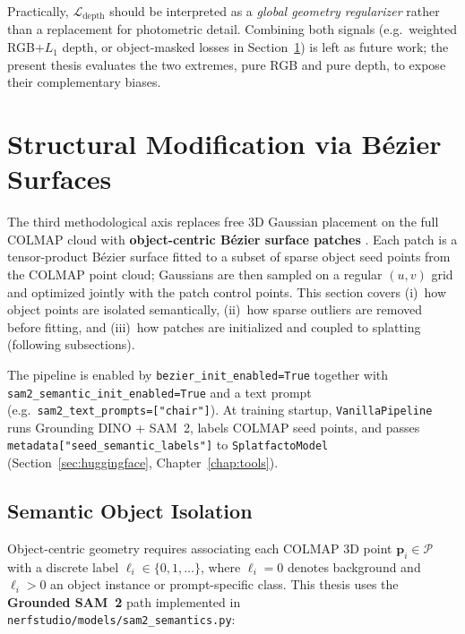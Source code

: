 \documentclass{report}
\newcommand{\filepath}[1]{\nolinkurl{#1}}
\newcommand{\code}[1]{\nolinkurl{#1}}
\begin{document}
Practically, $\mathcal{L}_{\mathrm{depth}}$ should be interpreted as a \emph{global geometry regularizer} rather than a replacement for photometric detail. Combining both signals (e.g.\ weighted RGB+$L_1$ depth, or object-masked losses in Section~\ref{sec:bezier_structural}) is left as future work; the present thesis evaluates the two extremes, pure RGB and pure depth, to expose their complementary biases.

\section{Structural Modification via B\'ezier Surfaces}
\label{sec:bezier_structural}

The third methodological axis replaces free 3D Gaussian placement on the full COLMAP cloud with \textbf{object-centric B\'ezier surface patches} \cite{liu2025bezier}. Each patch is a tensor-product B\'ezier surface fitted to a subset of sparse object seed points from the COLMAP point cloud; Gaussians are then sampled on a regular $(u,v)$ grid and optimized jointly with the patch control points. This section covers (i)~how object points are isolated semantically, (ii)~how sparse outliers are removed before fitting, and (iii)~how patches are initialized and coupled to splatting (following subsections).

The pipeline is enabled by \code{bezier\_init\_enabled=True} together with \code{sam2\_semantic\_init\_enabled=True} and a text prompt (e.g.\ \code{sam2\_text\_prompts=["chair"]}). At training startup, \code{VanillaPipeline} runs Grounding DINO + SAM~2, labels COLMAP seed points, and passes \code{metadata["seed\_semantic\_labels"]} to \code{SplatfactoModel} (Section~\ref{sec:huggingface}, Chapter~\ref{chap:tools}).

\subsection{Semantic Object Isolation}
\label{subsec:semantic_isolation}

Object-centric geometry requires associating each COLMAP 3D point $\mathbf{p}_i\in\mathcal{P}$ with a discrete label $\ell_i\in\{0,1,\ldots\}$, where $\ell_i=0$ denotes background and $\ell_i>0$ an object instance or prompt-specific class. This thesis uses the \textbf{Grounded SAM~2} path implemented in \filepath{nerfstudio/models/sam2\_semantics.py}:
\end{document}
